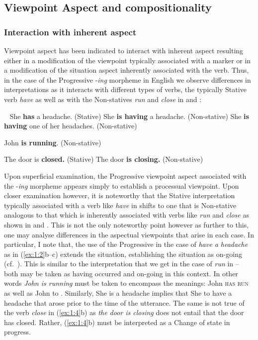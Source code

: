 \subsection{Viewpoint Aspect and compositionality}\label{sec:1.1.1}

\subsubsection{Interaction with inherent aspect}\label{sec:interaction}

Viewpoint aspect has been indicated to interact with inherent aspect resulting
either in a modification of the viewpoint typically associated with a marker or
in a modification of the situation aspect inherently associated with the verb.
Thus, in the case of the Progressive -\textit{ing} morpheme in English we
observe differences in interpretations as it interacts with different types of
verbs, the typically Stative verb \textit{have}  as well as with the
Non-statives \textit{run} and \textit{close} in  and :


\ea\label{ex:1:2}~\citep[adapted from][707]{Lyons1977}
  \ea She \textbf{has} a headache. (Stative)
  \ex She \textbf{is having} a headache. (Non-stative)
  \ex She \textbf{is having} one of her headaches. (Non-stative)
  \z
\z

\ea\label{ex:1:3} John \textbf{is running}. (Non-stative) \z


\ea\label{ex:1:4}
  \ea The door is \textbf{closed.} (Stative)
  \ex The door \textbf{is closing.} (Non-stative)
  \z
\z

Upon superficial examination, the Progressive viewpoint aspect associated with
the \--\textit{ing} morpheme appears simply to establish a processual viewpoint.
Upon closer examination however, it is noteworthy that the Stative
interpretation typically associated with a verb like \textit{have} in 
shifts to one that is Non-stative analogous to that which is inherently
associated with verbs like \textit{run} and \textit{close} as shown in  and
. This is not the only noteworthy point however as further to this,
one may analyse differences in the aspectual viewpoints that arise in each case.
In particular, I note that, the use of the Progressive in the case of  \textit{have a
headache} as in (\ref{ex:1:2}b--c) extends the situation, establishing the situation as
on-going (cf.\ \citealt{Guéron2008}). This is similar to the interpretation that we get
in the case of  \textit{run} in  -- both may be taken as having occurred
and on-going in this context. In other words \textit{John is running} must be
taken to encompass the meanings: John \textsc{has run} as well as John \CONTINUES to
\RUN\@.  Similarly, She is \HAVING a headache implies that She \CONTINUES to have a
headache that arose prior to the time of the utterance.  The same is not true of
the verb \textit{close} in (\ref{ex:1:4}b) as \textit{the door is closing} does not
entail that the door has closed.  Rather, (\ref{ex:1:4}b) must be interpreted as
a Change of state in progress.

